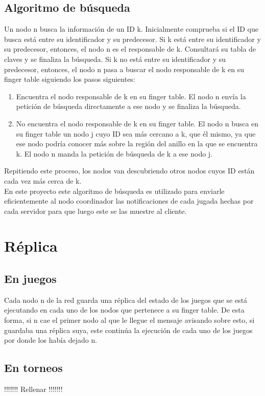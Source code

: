 \documentclass[10pt, a4paper]{article}
\begin{document}
    \subsection{Algoritmo de búsqueda}
    Un nodo n busca la información de un ID k. Inicialmente comprueba si el ID que busca está entre su identificador y su predecesor. Si k está entre su identificador y su predecesor, entonces, el nodo n es el responsable de k. Consultar\'a su tabla de claves y se finaliza la búsqueda. Si k no está entre su identificador y su predecesor, entonces, el nodo n pasa a buscar el nodo responsable de k en su finger table siguiendo los pasos siguientes: 
    \begin{enumerate}
    	 \item Encuentra el nodo responsable de k en su finger table. El nodo n envía la petición de búsqueda directamente a ese nodo y se finaliza la búsqueda.
    	 \item No encuentra el nodo responsable de k en su finger table. El nodo n busca en su finger table un nodo j cuyo ID sea más cercano a k, que él mismo, ya que ese nodo podr\'ia conocer más sobre la región del anillo en la que se encuentra k. El nodo n manda la petición de búsqueda de k a ese nodo j.
    \end{enumerate} 
    Repitiendo este proceso, los nodos van descubriendo otros nodos cuyos ID están cada vez más cerca de k.\\
    En este proyecto este algoritmo de búsqueda es utilizado para enviarle eficientemente al nodo coordinador las notificaciones de cada jugada hechas por cada servidor para que luego este se las muestre al cliente. \\
    
    \section{R\'eplica}
    \subsection{En juegos}
    Cada nodo n de la red guarda una réplica del estado de los juegos que se está ejecutando en cada uno de los nodos que pertenece a su finger table. De esta forma, si n cae el primer nodo al que le llegue el mensaje avisando sobre esto, si guardaba una réplica suya, este continúa la ejecución de cada uno de los juegos por donde los había dejado n.\\
    
    \subsection{En torneos}
    !!!!!!!
    Rellenar
    !!!!!!!\\
    
\end{document}

